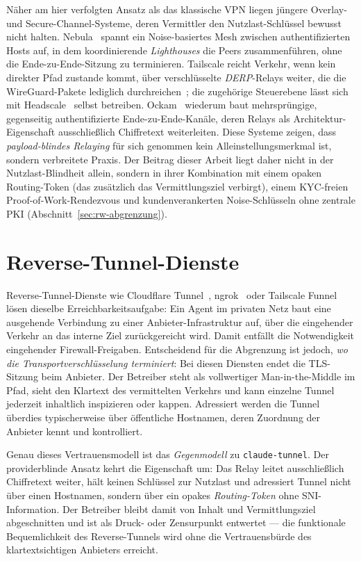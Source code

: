 Näher am hier verfolgten Ansatz als das klassische VPN liegen jüngere Overlay-
und Secure-Channel-Systeme, deren Vermittler den Nutzlast-Schlüssel bewusst nicht
halten. Nebula~\cite{nebula} spannt ein Noise-basiertes Mesh zwischen
authentifizierten Hosts auf, in dem koordinierende \emph{Lighthouses} die Peers
zusammenführen, ohne die Ende-zu-Ende-Sitzung zu terminieren. Tailscale reicht
Verkehr, wenn kein direkter Pfad zustande kommt, über verschlüsselte
\emph{DERP}-Relays weiter, die die WireGuard-Pakete lediglich
durchreichen~\cite{tailscalederp}; die zugehörige Steuerebene lässt sich mit
Headscale~\cite{headscale} selbst betreiben. Ockam~\cite{ockam} wiederum baut
mehrsprüngige, gegenseitig authentifizierte Ende-zu-Ende-Kanäle, deren Relays
als Architektur-Eigenschaft ausschließlich Chiffretext weiterleiten. Diese
Systeme zeigen, dass \emph{payload-blindes Relaying} für sich genommen kein
Alleinstellungsmerkmal ist, sondern verbreitete Praxis. Der Beitrag dieser Arbeit
liegt daher nicht in der Nutzlast-Blindheit allein, sondern in ihrer Kombination
mit einem opaken Routing-Token (das zusätzlich das Vermittlungsziel verbirgt),
einem KYC-freien Proof-of-Work-Rendezvous und kundenverankerten Noise-Schlüsseln
ohne zentrale PKI (Abschnitt~\ref{sec:rw-abgrenzung}).

\section{Reverse-Tunnel-Dienste}
\label{sec:rw-reverse}

Reverse-Tunnel-Dienste wie Cloudflare Tunnel~\cite{cloudflaretunnel},
ngrok~\cite{ngrok} oder Tailscale Funnel~\cite{tailscalefunnel} lösen
dieselbe Erreichbarkeitsaufgabe: Ein Agent im privaten Netz baut eine
ausgehende Verbindung zu einer Anbieter-Infrastruktur auf, über die eingehender
Verkehr an das interne Ziel zurückgereicht wird. Damit entfällt die
Notwendigkeit eingehender Firewall-Freigaben. Entscheidend für die Abgrenzung ist
jedoch, \emph{wo die Transport\-verschlüsselung terminiert}: Bei diesen Diensten
endet die TLS-Sitzung beim Anbieter. Der Betreiber steht als vollwertiger
Man-in-the-Middle im Pfad, sieht den Klartext des vermittelten Verkehrs und kann
einzelne Tunnel jederzeit inhaltlich inspizieren oder kappen. Adressiert werden
die Tunnel überdies typischerweise über öffentliche Hostnamen, deren Zuordnung
der Anbieter kennt und kontrolliert.

Genau dieses Vertrauensmodell ist das \emph{Gegenmodell} zu \texttt{claude-tunnel}.
Der providerblinde Ansatz kehrt die Eigenschaft um: Das Relay leitet
ausschließlich Chiffretext weiter, hält keinen Schlüssel zur Nutzlast und
adressiert Tunnel nicht über einen Hostnamen, sondern über ein opakes
\emph{Routing-Token} ohne SNI-Information. Der Betreiber bleibt damit von Inhalt
und Vermittlungsziel abgeschnitten und ist als Druck- oder Zensurpunkt entwertet
--- die funktionale Bequemlichkeit des Reverse-Tunnels wird ohne die
Vertrauensbürde des klartextsichtigen Anbieters erreicht.

